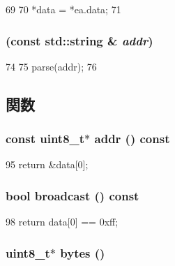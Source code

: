 \begin{DoxyCode}
69 {
70     *data = *ea.data;
71 }
\end{DoxyCode}
\hypertarget{structNet_1_1EthAddr_a86d43efad93c0c40cc1359d14f032367}{
\subsubsection[{EthAddr}]{ (const std::string \& {\em addr})}}
\label{structNet_1_1EthAddr_a86d43efad93c0c40cc1359d14f032367}



\begin{DoxyCode}
74 {
75     parse(addr);
76 }
\end{DoxyCode}


\subsection{関数}
\hypertarget{structNet_1_1EthAddr_a0ac65c3f2d8239c6908c643e8ef77bfb}{
\subsubsection[{addr}]{\setlength{\rightskip}{0pt plus 5cm}const uint8\_\-t$\ast$ addr () const}}
\label{structNet_1_1EthAddr_a0ac65c3f2d8239c6908c643e8ef77bfb}



\begin{DoxyCode}
95 { return &data[0]; }
\end{DoxyCode}
\hypertarget{structNet_1_1EthAddr_ae7f045c4687f86f0288db4bd7c1ac6f1}{
\subsubsection[{broadcast}]{\setlength{\rightskip}{0pt plus 5cm}bool broadcast () const}}
\label{structNet_1_1EthAddr_ae7f045c4687f86f0288db4bd7c1ac6f1}



\begin{DoxyCode}
98 { return data[0] == 0xff; }
\end{DoxyCode}
\hypertarget{structNet_1_1EthAddr_add4fb6fe45a091194dc9eac521194698}{
\subsubsection[{bytes}]{\setlength{\rightskip}{0pt plus 5cm}uint8\_\-t$\ast$ bytes ()}}
\label{structNet_1_1EthAddr_add4fb6fe45a091194dc9eac521194698}



